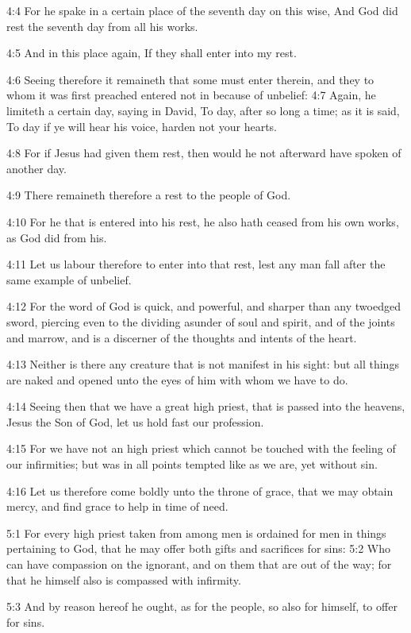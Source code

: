 4:4 For he spake in a certain place of the seventh day on this wise, And God did rest the seventh day from all his works.

4:5 And in this place again, If they shall enter into my rest.

4:6 Seeing therefore it remaineth that some must enter therein, and they to whom it was first preached entered not in because of unbelief: 4:7 Again, he limiteth a certain day, saying in David, To day, after so long a time; as it is said, To day if ye will hear his voice, harden not your hearts.

4:8 For if Jesus had given them rest, then would he not afterward have spoken of another day.

4:9 There remaineth therefore a rest to the people of God.

4:10 For he that is entered into his rest, he also hath ceased from his own works, as God did from his.

4:11 Let us labour therefore to enter into that rest, lest any man fall after the same example of unbelief.

4:12 For the word of God is quick, and powerful, and sharper than any twoedged sword, piercing even to the dividing asunder of soul and spirit, and of the joints and marrow, and is a discerner of the thoughts and intents of the heart.

4:13 Neither is there any creature that is not manifest in his sight: but all things are naked and opened unto the eyes of him with whom we have to do.

4:14 Seeing then that we have a great high priest, that is passed into the heavens, Jesus the Son of God, let us hold fast our profession.

4:15 For we have not an high priest which cannot be touched with the feeling of our infirmities; but was in all points tempted like as we are, yet without sin.

4:16 Let us therefore come boldly unto the throne of grace, that we may obtain mercy, and find grace to help in time of need.

5:1 For every high priest taken from among men is ordained for men in things pertaining to God, that he may offer both gifts and sacrifices for sins: 5:2 Who can have compassion on the ignorant, and on them that are out of the way; for that he himself also is compassed with infirmity.

5:3 And by reason hereof he ought, as for the people, so also for himself, to offer for sins.

